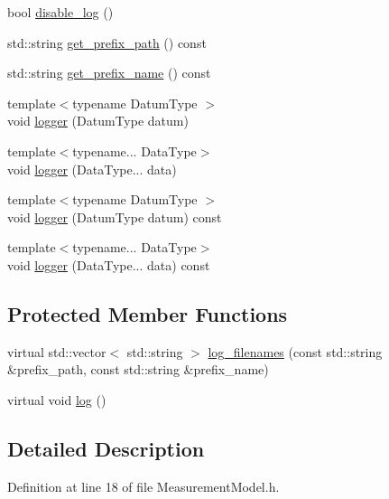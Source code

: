 \begin{DoxyCompactItemize}
bool \mbox{\hyperlink{classbfl_1_1Logger_a440467a28ccc46490d767fe0ef6f556a}{disable\+\_\+log}} ()
\item 
std\+::string \mbox{\hyperlink{classbfl_1_1Logger_a56cf1a4e712bf23d9978420a8a59a62b}{get\+\_\+prefix\+\_\+path}} () const
\item 
std\+::string \mbox{\hyperlink{classbfl_1_1Logger_a913a795b7bfbf378815eeb342d68a7c0}{get\+\_\+prefix\+\_\+name}} () const
\item 
{\footnotesize template$<$typename Datum\+Type $>$ }\\void \mbox{\hyperlink{classbfl_1_1Logger_a1033ff31398484f2132f84fd140da9e3}{logger}} (Datum\+Type datum)
\item 
{\footnotesize template$<$typename... Data\+Type$>$ }\\void \mbox{\hyperlink{classbfl_1_1Logger_aca2086c9256e5c404872b91f7f25b97d}{logger}} (Data\+Type... data)
\item 
{\footnotesize template$<$typename Datum\+Type $>$ }\\void \mbox{\hyperlink{classbfl_1_1Logger_a50b1c109730fa98f66e66f420f0158fe}{logger}} (Datum\+Type datum) const
\item 
{\footnotesize template$<$typename... Data\+Type$>$ }\\void \mbox{\hyperlink{classbfl_1_1Logger_a0f0cf7ce956546d94dfb1feb7cebf171}{logger}} (Data\+Type... data) const
\end{DoxyCompactItemize}
\subsection*{Protected Member Functions}
\begin{DoxyCompactItemize}
\item 
virtual std\+::vector$<$ std\+::string $>$ \mbox{\hyperlink{classbfl_1_1Logger_a328ceaa8e70e6918f11142b12b8be217}{log\+\_\+filenames}} (const std\+::string \&prefix\+\_\+path, const std\+::string \&prefix\+\_\+name)
\item 
virtual void \mbox{\hyperlink{classbfl_1_1Logger_ad44f46593cb8c4c87c1178eb326e2f64}{log}} ()
\end{DoxyCompactItemize}


\subsection{Detailed Description}


Definition at line 18 of file Measurement\+Model.\+h.



